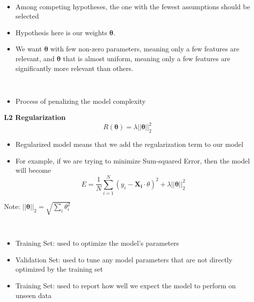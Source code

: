 \documentclass[12pt]{article}
\newenvironment{concept}[1]{\begin{trivlist}
		\item[\hskip \labelsep {\bfseries #1}]}{\end{trivlist}}
\begin{document}
\begin{concept}{Occam's razor}
	\	
	\begin{itemize}
		\item {
			Among competing hypotheses, the one with the fewest assumptions should be selected
		}
		\item {
			Hypothesis here is our weights $\boldsymbol{\theta}$.
		}
		\item {
			We want $\boldsymbol{\theta}$ with few non-zero parameters, meaning only a few features are relevant, and $\boldsymbol{\theta}$ that is
			almost uniform, meaning only a few features are significantly more relevant than others.
		}
	\end{itemize}
\end{concept}

\begin{concept}{Regularization}
	\
	\begin{itemize}
		\item {
			Process of penalizing the model complexity
		}
	\end{itemize}
	
	\textbf{L2 Regularization}
	$$R(\boldsymbol{\theta}) = \lambda ||\boldsymbol{\theta}||^2_2$$
	
	\begin{itemize}
		\item {
			Regularized model means that we add the regularization term to our model
		}
		\item {
			For example, if we are trying to minimize Sum-squared Error, then the model will become
			$$E = \frac{1}{N} \sum_{i=1}^{N} (y_i - \boldsymbol{X_i} \cdot \theta)^2 + \lambda ||\boldsymbol{\theta}||^2_2$$
		}
	\end{itemize}

	Note: $||\boldsymbol{\theta}||_2 = \sqrt{\sum_{i}^{} \theta_i ^2}$
\end{concept}

\begin{concept}{Data Sets}
	\
	\begin{itemize}
		\item {
			Training Set: used to optimize the model's parameters
		}
		\item {
			Validation Set: used to tune any model parameters that are not directly optimized by the training set
		}
		\item {
			Training Set: used to report how well we expect the model to perform on unseen data
		}
	\end{itemize}
\end{concept}
\end{document}
